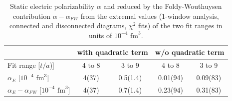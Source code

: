 \begin{table}[H]
\begin{center}
    \begin{tabular}{|l||c|c||c|c||}
    \hline	& \multicolumn{2}{c||}{with quadratic term} & \multicolumn{2}{c||}{w/o quadratic term} \\ \hline
     Fit range [$t/a$)]						& 4 to 8 	& 3 to 9 	& 4 to 8 	& 3 to 9 \\ \hline 
     $\alpha_E$ [$10^{-4}$ $\text{fm}^3$]    		& 4(37)	& 0.5(1.4) 	& 0.01(94)	& 0.09(83) \\ \hline     
     $\alpha_E-\alpha_{FW}$ [$10^{-4}$ $\text{fm}^3$]& 4(37)	&  0.7(1.4)	& 0.23(94)	& 0.31(83) \\ \hline
    \end{tabular}
\end{center}
\caption{Static electric polarizability  $\alpha$ and reduced by the Foldy-Wouthuysen contribution $\alpha-\alpha_{FW}$ from the extremal values (1-window analysis, connected and disconnected diagrams, $\chi^2$ fits) of the two fit ranges in units of $10^{-4}$ $\text{fm}^3$. }
\label{tab:1wElectricPolarizabilityAllMultiPoint}
\end{table}
